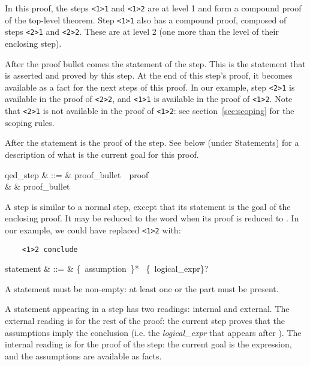 In this proof, the steps \verb"<1>1" and \verb"<1>2" are at level 1
and form a compound proof of the top-level theorem.  Step \verb"<1>1"
also has a compound proof, composed of steps \verb"<2>1"
and \verb"<2>2".  These are at level 2 (one more than the level of
their enclosing step).

After the proof bullet comes the statement of the step.  This is the
statement that is asserted and proved by this step.  At the end of
this step's proof, it becomes available as a fact for the next steps
of this proof.  In our example, step \verb"<2>1" is available in the
proof of \verb"<2>2", and \verb"<1>1" is available in the proof of
\verb"<1>2".  Note that \verb"<2>1" is not available in the proof of
\verb"<1>2": see section~\ref{sec:scoping} for the scoping rules.

After the statement is the proof of the step.  See below (under
Statements) for a description of what is the current goal for this
proof.

\begin{syntax}
qed\_step & ::=  & proof\_bullet\ \ proof \\
          & \mid & proof\_bullet\ 
\end{syntax}

A  step is similar to a normal step, except that its
statement is the goal of the enclosing proof.  It may be reduced to
the word  when its proof is reduced to
.  In our example, we could have replaced
\verb"<1>2" with:
\begin{verbatim}
    <1>2 conclude
\end{verbatim}

\begin{syntax}
statement & ::=  & {\{\ assumption\ \terminal{,}\}*}
                   \ \{\ logical\_expr\}?
\end{syntax}
A statement must be non-empty: at least one  or the
 part must be present.

A statement appearing in a step has two readings: internal and
external.  The external reading is for the rest of the
proof: the current step proves that the assumptions imply the
conclusion (i.e. the {\em logical\_expr} that appears after
).  The internal reading is for the proof of the step:
the current goal is the  expression, and the
assumptions are available as facts.

